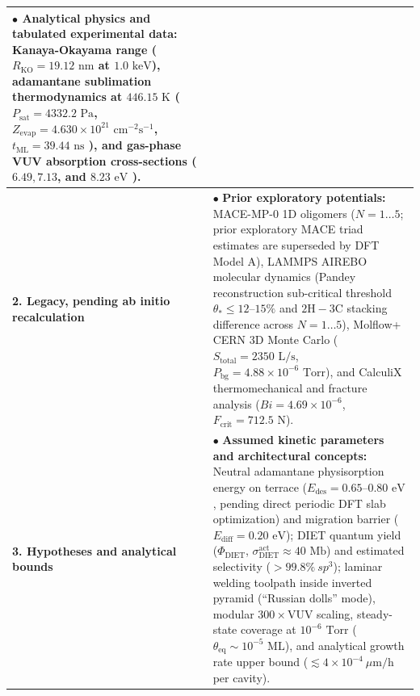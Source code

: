 \documentclass[10pt,twocolumn,a4paper]{article}
\begin{document}
\begin{table}[t]
{\begin{tabular}{@{}p{4.2cm}p{13.6cm}@{}}
$\bullet$ \textbf{Analytical physics and tabulated experimental data:} Kanaya-Okayama range ($R_{\text{KO}} = 19.12\text{ nm}$ at $1.0\text{ keV}$), adamantane sublimation thermodynamics at $446.15\text{ K}$ ($P_{\text{sat}} = 4332.2\text{ Pa}$, $Z_{\text{evap}} = 4.630 \times 10^{21}\text{ cm}^{-2}\text{s}^{-1}$, $t_{\text{ML}} = 39.44\text{ ns}$ \cite{Bazyleva2011}), and gas-phase VUV absorption cross-sections ($6.49, 7.13$, and $8.23\text{ eV}$ \cite{Marder2023}). \\ \midrule
\textbf{2. Legacy, pending ab initio recalculation} &
$\bullet$ \textbf{Prior exploratory potentials:} MACE-MP-0 1D oligomers ($N=1\dots5$; prior exploratory MACE triad estimates are superseded by DFT Model A), LAMMPS AIREBO molecular dynamics (Pandey reconstruction sub-critical threshold $\theta_* \le 12\text{--}15\%$ and $2\text{H}-3\text{C}$ stacking difference across $N=1\dots5$), Molflow+ CERN 3D Monte Carlo ($S_{\text{total}} = 2350\text{ L/s}$, $P_{\text{bg}} = 4.88 \times 10^{-6}\text{ Torr}$), and CalculiX thermomechanical and fracture analysis ($Bi = 4.69 \times 10^{-6}$, $F_{\text{crit}} = 712.5\text{ N}$). \\ \midrule
\textbf{3. Hypotheses and analytical bounds} &
$\bullet$ \textbf{Assumed kinetic parameters and architectural concepts:} Neutral adamantane physisorption energy on terrace ($E_{\text{des}} = 0.65\text{--}0.80\text{ eV}$, pending direct periodic DFT slab optimization) and migration barrier ($E_{\text{diff}} = 0.20\text{ eV}$); DIET quantum yield ($\Phi_{\text{DIET}}$, $\sigma_{\text{DIET}}^{\text{act}} \approx 40\text{ Mb}$) and estimated selectivity ($>99.8\%\ sp^3$); laminar welding toolpath inside inverted pyramid (``Russian dolls'' mode), modular $300 \times \text{VUV}$ scaling, steady-state coverage at $10^{-6}\text{ Torr}$ ($\theta_{\text{eq}} \sim 10^{-5}\text{ ML}$), and analytical growth rate upper bound ($\lesssim 4 \times 10^{-4}\ \mu\text{m/h}$ per cavity). \\ \bottomrule
\end{tabular}%
}
\end{table}
\end{document}
